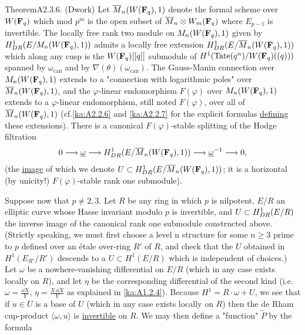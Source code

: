 \begin{kathm}{Theorem}{A2.3.6.}
(Dwork) Let $\overline{M}_n(W(\mathbf{F}_q),1)$ denote the formal scheme over $W(\mathbf{F}_q)$ which
mod $p^m$ is the open subset of $\overline{M}_n\otimes W_m(\mathbf{F}_q)$ where $E_{p-1}$ is
invertible. The locally free rank two module on $M_n(W(\mathbf{F}_q),1)$ given by
$H^1_{DR}(E/M_n(W(\mathbf{F}_q),1))$ admits a locally free extension
$H^1_{DR}(E/\overline{M}_n(W(\mathbf{F}_q),1))$ which along any cusp is the
$W(\mathbf{F}_q)[[q]]$ submodule of $H^1(\mathrm{Tate}(q^n)/W(\mathbf{F}_q)((q)))$ spanned by
$\omega_{\mathrm{can}}$ and by $\nabla(\theta)(\omega_{\mathrm{can}})$. The
Gauss-Manin connection over $M_n(W(\mathbf{F}_q),1)$ extends to a "connection with
logarithmic poles" over $\overline{M}_n(W(\mathbf{F}_q),1)$, and the $\varphi$-linear
endomorphism $F(\varphi)$ over $M_n(W(\mathbf{F}_q),1)$ extends to a $\varphi$-linear
endomorphism, still noted $F(\varphi)$, over all of $\overline{M}_n(W(\mathbf{F}_q),1)$
(cf.\eqref{ka:A2.2.6} and \eqref{ka:A2.2.7} for the explicit formulas \uline{defining} these
extensions). There is a canonical $F(\varphi)$-stable splitting of the Hodge
filtration
\[
0\longrightarrow\underline{\omega}\longrightarrow H^1_{DR}(E/\overline{M}_n(W(\mathbf{F}_q),1))
\longrightarrow\underline{\omega}^{-1}\longrightarrow 0 ,
\]
(the \uline{image} of which we denote $U\subset H^1_{DR}(E/\overline{M}_n(W(\mathbf{F}_q),1))$;
it is a horizontal (by unicity!) $F(\varphi)$-stable rank one submodule).
\end{kathm}


Suppose now that $p\neq 2,3$. Let $R$ be any ring in which $p$ is
nil\-potent, $E/R$ an elliptic curve whose Hasse invariant modulo $p$ is
invertible, and $U\subset H^1_{DR}(E/R)$ the inverse image of the canonical
rank one submodule constructed above. (Strictly speaking, we must first choose a
level n structure for some $n\geq 3$ prime to $p$ defined over an \'etale
over-ring $R'$ of $R$, and check that the $U$ obtained in
$H^1(E_{R'}/R')$ descends to a $U\subset H^1(E/R)$ which is independent of
choices.) Let $\omega$ be a nowhere-vanishing differential on $E/R$ (which in
any case exists locally on $R$), and let $\eta$ be the corresponding
differential of the second kind (i.e.\ $\omega=\frac{\dd X}{Y}$,
$\eta=\frac{X\,\dd X}{Y}$ as explained in \eqref{ka:A1.2.4}). Because
$H^1=R\cdot\omega+U$, we see that if $u\in U$ is a base of $U$ (which in any
case exists locally on $R$) then the de Rham cup-product
$\langle\omega,u\rangle$ is \uline{invertible} on $R$. We may then define a
"function" $\widetilde{P}$ by the formula

